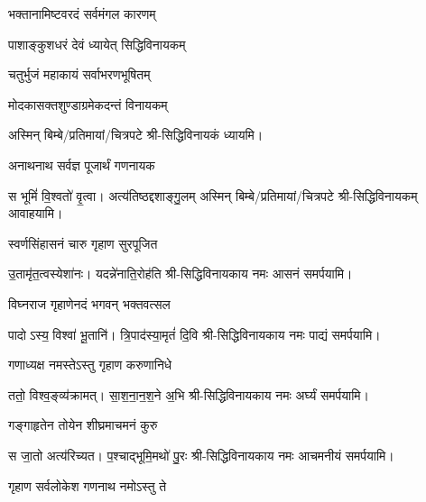 \begin{center}

{भक्तानामिष्टवरदं सर्वमंगल कारणम्}

{पाशाङ्कुशधरं देवं ध्यायेत् सिद्धिविनायकम्}

{चतुर्भुजं महाकायं सर्वाभरणभूषितम्}

{मोदकासक्तशुण्डाग्रमेकदन्तं विनायकम्}

अस्मिन् बिम्बे/प्रतिमायां/चित्रपटे श्री-सिद्धिविनायकं ध्यायमि।

{अनाथनाथ सर्वज्ञ पूजार्थं गणनायक}

{स भूमिं॑ वि॒श्वतो॑ वृ॒त्वा। अत्य॑तिष्ठद्दशाङ्गु॒लम्}
अस्मिन् बिम्बे/प्रतिमायां/चित्रपटे श्री-सिद्धिविनायकम् आवाहयामि।
\medskip

{स्वर्णसिंहासनं चारु गृहाण सुरपूजित}

{उ॒तामृ॑त॒त्वस्येशा॑नः। यदन्ने॑नाति॒रोह॑ति}
श्री-सिद्धिविनायकाय नमः आसनं समर्पयामि।\medskip

{विघ्नराज गृहाणेनदं भगवन् भक्तवत्सल}

{पादोऽस्य॒ विश्वा॑ भू॒तानि॑। त्रि॒पाद॑स्या॒मृतं॑ दि॒वि}
श्री-सिद्धिविनायकाय नमः पाद्यं समर्पयामि।\medskip

{गणाध्यक्ष नमस्तेऽस्तु गृहाण करुणानिधे}

{ततो॒ विश्व॒ङ्व्य॑क्रामत्। सा॒श॒ना॒न॒श॒ने अ॒भि}
श्री-सिद्धिविनायकाय नमः अर्घ्यं समर्पयामि।\medskip

{गङ्गाहृतेन तोयेन शीघ्रमाचमनं कुरु}

{स जा॒तो अत्य॑रिच्यत। प॒श्चाद्भूमि॒मथो॑ पु॒रः}
श्री-सिद्धिविनायकाय नमः आचमनीयं समर्पयामि।\medskip

{गृहाण सर्वलोकेश गणनाथ नमोऽस्तु ते}


\end{center}
